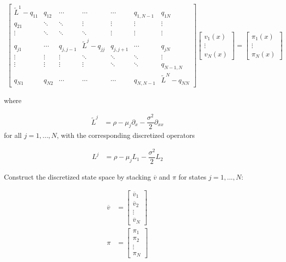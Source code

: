 \documentclass[11pt]{article}
\theoremstyle{definition}
\begin{document}
\begin{align}
\begin{bmatrix}
\tilde{L}^1 -q_{11} & q_{12} & \cdots &  \cdots & \cdots & q_{1,N-1} & q_{1N} \\ 
q_{21} & \ddots & \ddots & \vdots & \vdots & \vdots & \vdots  \\
\vdots & \ddots & \ddots & \ddots  & \vdots & \vdots & \vdots
\\
q_{j1} &  \cdots & q_{j,j-1} & \tilde{L}^j - q_{jj} & q_{j,j+1} & \cdots & q_{jN} \\
\vdots & \vdots& \vdots &  \ddots & \ddots & \ddots  & \vdots \\ 
\vdots & \vdots  & \vdots& \vdots &  \ddots & \ddots & q_{N-1,N} \\
q_{N1} & q_{N2} & \cdots &  \cdots & \cdots & q_{N,N-1} & \tilde{L}^N - q_{NN} 
\end{bmatrix}
\begin{bmatrix}
v_1 (x) \\
\vdots \\
v_N (x)
\end{bmatrix}
=
\begin{bmatrix}
\pi_1 (x) \\
\vdots \\
\pi_N (x)
\end{bmatrix}
\end{align}

where

\begin{align}
\tilde{L}^j &= \rho - \mu_j \partial_{x} - \dfrac{\sigma^2}{2} \partial_{xx} 
\end{align}
for all $j = 1,...,N$, with the corresponding discretized operators

\begin{align}
{L}^j &= \rho - \mu_j L_1 - \dfrac{\sigma^2}{2} L_2 
\end{align}

Construct the discretized state space by stacking $\overline{v}$ and ${\pi}$ for states $j= 1, ...,N$:

\begin{align}
\overline{v} &= \begin{bmatrix}
\overline{v}_1 \\
\overline{v}_2 \\ 
\vdots \\
\overline{v}_N
\end{bmatrix} \\
\pi &= \begin{bmatrix}
\pi_1\\
\pi_2 \\
\vdots \\
\pi_N 
\end{bmatrix}
\end{align}
\end{document}
